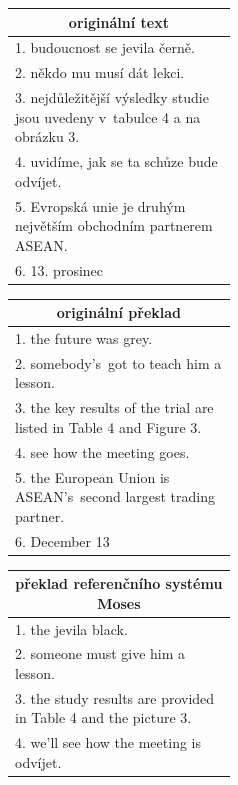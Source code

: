 \begin{table}[H]
    \begin{center}
        \begin{tabular}{p{0.44\linewidth}}
          \toprule
          \multicolumn{1}{c}{originální text} \\
          \midrule
          1. budoucnost se jevila černě. \\
          2. někdo mu musí dát lekci. \\
          3. nejdůležitější výsledky studie jsou uvedeny v~tabulce 4 a na obrázku 3. \\
          4. uvidíme, jak se ta schůze bude odvíjet. \\
          5. Evropská unie je druhým největším obchodním partnerem ASEAN. \\
          6. 13. prosinec \\
          \bottomrule
        \end{tabular}
        \hspace{5mm}
        \begin{tabular}{p{0.44\linewidth}}
          \toprule
          \multicolumn{1}{c}{originální překlad} \\
          \midrule
          1. the future was grey. \\
          2. somebody's~got to teach him a lesson. \\
          3. the key results of the trial are listed in Table 4 and Figure 3. \\
          4. see how the meeting goes. \\
          5. the European Union is ASEAN's~second largest trading partner. \\
          6. December 13 \\
          \bottomrule
        \end{tabular}
    \end{center}
    \begin{center}
        \begin{tabular}{p{0.44\linewidth}}
          \toprule
          \multicolumn{1}{c}{překlad referenčního systému Moses} \\
          \midrule
          1. the jevila black.  \\
          2. someone must give him a lesson.  \\
          3. the study results are provided in Table 4 and the picture 3. \\
          4. we'll see how the meeting is odvíjet. \\

\end{tabular}
\end{center}
\end{table}
